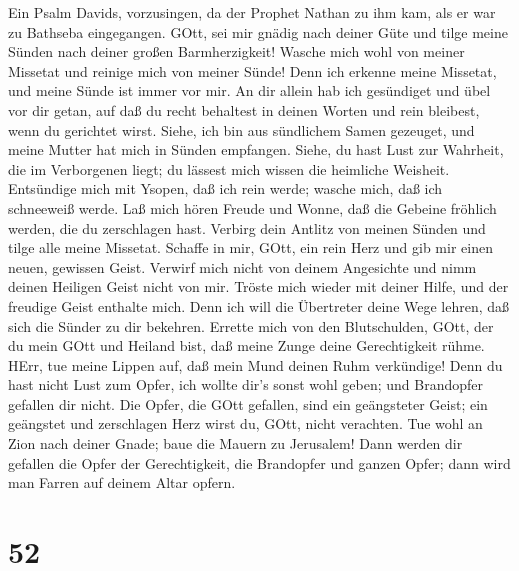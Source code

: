 Ein Psalm Davids, vorzusingen,  da der Prophet
Nathan zu ihm kam, als er war zu Bathseba eingegangen. 
GOtt, sei mir gnädig nach deiner Güte und tilge meine Sünden nach deiner
großen Barmherzigkeit!  Wasche mich wohl von meiner Missetat
und reinige mich von meiner Sünde!  Denn ich erkenne meine
Missetat, und meine Sünde ist immer vor mir.  An dir allein
hab ich gesündiget und übel vor dir getan, auf daß du recht behaltest in
deinen Worten und rein bleibest, wenn du gerichtet wirst. 
Siehe, ich bin aus sündlichem Samen gezeuget, und meine Mutter hat mich
in Sünden empfangen.  Siehe, du hast Lust zur Wahrheit, die
im Verborgenen liegt; du lässest mich wissen die heimliche Weisheit.
 Entsündige mich mit Ysopen, daß ich rein werde; wasche
mich, daß ich schneeweiß werde.  Laß mich hören Freude und
Wonne, daß die Gebeine fröhlich werden, die du zerschlagen hast.
 Verbirg dein Antlitz von meinen Sünden und tilge alle
meine Missetat.  Schaffe in mir, GOtt, ein rein Herz und
gib mir einen neuen, gewissen Geist.  Verwirf mich nicht
von deinem Angesichte und nimm deinen Heiligen Geist nicht von mir.
 Tröste mich wieder mit deiner Hilfe, und der freudige
Geist enthalte mich.  Denn ich will die Übertreter deine
Wege lehren, daß sich die Sünder zu dir bekehren.  Errette
mich von den Blutschulden, GOtt, der du mein GOtt und Heiland bist, daß
meine Zunge deine Gerechtigkeit rühme.  HErr, tue meine
Lippen auf, daß mein Mund deinen Ruhm verkündige!  Denn du
hast nicht Lust zum Opfer, ich wollte dir's sonst wohl geben; und
Brandopfer gefallen dir nicht.  Die Opfer, die GOtt
gefallen, sind ein geängsteter Geist; ein geängstet und zerschlagen Herz
wirst du, GOtt, nicht verachten.  Tue wohl an Zion nach
deiner Gnade; baue die Mauern zu Jerusalem!  Dann werden
dir gefallen die Opfer der Gerechtigkeit, die Brandopfer und ganzen
Opfer; dann wird man Farren auf deinem Altar opfern.

\hypertarget{section-51}{%
\section{52}\label{section-51}}

